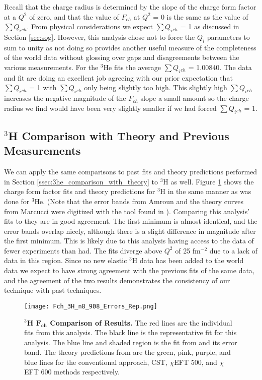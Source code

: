 Recall that the charge radius is determined by the slope of the charge form factor at a $Q^2$ of zero, and that the value of $F_{ch}$ at $Q^2$ = 0 is the same as the value of $\sum Q_i{_{ch}}$. From physical considerations we expect $\sum Q_i{_{ch}}$ = 1 as discussed in Section \ref{sec:sog}. However, this analysis chose not to force the $Q_i$ parameters to sum to unity as not doing so provides another useful measure of the completeness of the world data without glossing over gaps and disagreements between the various measurements. For the $^3$He fits the average $\sum Q_i{_{ch}}$ = 1.00840. The data and fit are doing an excellent job agreeing with our prior expectation that $\sum Q_i{_{ch}}$ = 1 with $\sum Q_i{_{ch}}$ only being slightly too high. This slightly high $\sum Q_i{_{ch}}$ increases the negative magnitude of the $F_{ch}$ slope a small amount so the charge radius we find would have been very slightly smaller if we had forced $\sum Q_i{_{ch}}$ = 1. 

\subsection{$^3$H Comparison with Theory and Previous Measurements}
\label{ssec:3h_comparison_with_theory}

We can apply the same comparisons to past fits and theory predictions performed in Section \ref{ssec:3he_comparison_with_theory} to $^3$H as well. Figure \ref{fig:3h_fch_theory} shows the charge form factor fits and theory predictions for $^3$H in the same manner as was done for $^3$He. (Note that the error bands from Amroun and the theory curves from Marcucci were digitized with the tool found in \cite{web_plot_digitizer}). Comparing this analysis' fits to \cite{Article:Amroun} they are in good agreement. The first minimum is almost identical, and the error bands overlap nicely, although there is a slight difference in magnitude after the first minimum. This is likely due to this analysis having access to the data of fewer experiments than \cite{Article:Amroun} had. The fits diverge above $Q^2$ of 25 fm$^{-2}$ due to a lack of data in this region. Since no new elastic $^3$H data has been added to the world data we expect to have strong agreement with the previous fits of the same data, and the agreement of the two results demonstrates the consistency of our technique with past techniques. 

\begin{figure}[!ht]
	\begin{center}
	\texttt{[image: Fch\_3H\_n8\_908\_Errors\_Rep.png]}
	\end{center}
	\caption[$^3$H $F_{ch}$ Comparison of Results]{
	{\bf{$^3$H $\boldsymbol{F_{ch}}$ Comparison of Results.}} The red lines are the individual fits from this analysis. The black line is the representative fit for this analysis. The blue line and shaded region is the fit from \cite{Article:Amroun} and its error band. The theory predictions from \cite{Article:Marcucci} are the green, pink, purple, and blue lines for the conventional approach, CST, $\chi$EFT 500, and $\chi$EFT 600 methods respectively.}
	\label{fig:3h_fch_theory}
\end{figure}

